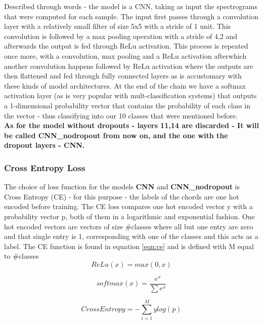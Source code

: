 \documentclass[a4paper]{article}
\begin{document}
\noindent Described through words - the model is a CNN, taking as input the spectrograms that were computed for each sample. The input first passes through a convolution \cite{conv} layer with a relatively small filter of size 5x5 with a stride of 1 unit. This convolution is followed by a max pooling operation with a stride of 4,2 and afterwards the output is fed through ReLu \cite{relu} activation. This process is repeated once more, with a convolution, max pooling and a ReLu activation afterwhich another convolution happens followed by ReLu activation where the outputs are then flattened and fed through fully connected layers as is accustomary with these kinds of model architectures. At the end of the chain we have a softmax activation layer (as is very popular with mult-classification systems) that outputs a 1-dimensional probability vector that contains the
probability of each class in the vector - thus classifying into our 10 classes that were mentioned before.
\\
\textbf{As for the model without dropouts - layers 11,14 are discarded - It will be called CNN\_nodropout from now on, and the one with the dropout layers - CNN.}

\subsubsection{Cross Entropy Loss}
The choice of loss function for the models \textbf{CNN} and \textbf{CNN\_nodropout} is Cross Entropy (CE) \cite{cross_entropy} - for this purpose - the labels of the chords are one hot encoded before training. The 
CE loss compares one hot encoded vector y with a probability vector p, both of them in a logarithmic and exponential fashion. One hot encoded vectors are vectors of size \#classes where all but one entry are zero and that single entry is 1, corresponding with one of the classes and this acts as a label. The CE function is found in equation \ref{eqn:ce} and is defined with M equal to \#classes
\begin{equation} \label{eqn:relu}
    ReLu(x) = max(0, x) 
\end{equation}

\begin{equation} \label{eqn:softmax}
    softmax(x) = \frac{e^x}{\sum e^x}
\end{equation}

\begin{equation} \label{eqn:ce}
    CrossEntropy = -\sum_{i=1}^{M} ylog(p)
\end{equation}
\end{document}
